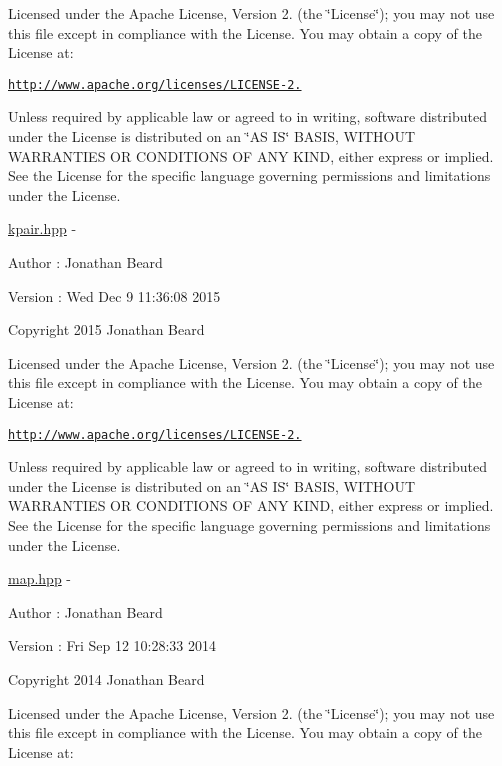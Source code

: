 Licensed under the Apache License, Version 2. (the \char`\"{}\+License\char`\"{}); you may not use this file except in compliance with the License. You may obtain a copy of the License at\+:

\href{http://www.apache.org/licenses/LICENSE-2.0}{\tt http\+://www.\+apache.\+org/licenses/\+L\+I\+C\+E\+N\+S\+E-\/2.}

Unless required by applicable law or agreed to in writing, software distributed under the License is distributed on an \char`\"{}\+A\+S I\+S\char`\"{} B\+A\+S\+IS, W\+I\+T\+H\+O\+UT W\+A\+R\+R\+A\+N\+T\+I\+ES OR C\+O\+N\+D\+I\+T\+I\+O\+NS OF A\+NY K\+I\+ND, either express or implied. See the License for the specific language governing permissions and limitations under the License.

\hyperlink{kpair_8hpp_source}{kpair.\+hpp} -\/ \begin{DoxyAuthor}{Author}
\+: Jonathan Beard 
\end{DoxyAuthor}
\begin{DoxyVersion}{Version}
\+: Wed Dec 9 11\+:36\+:08 2015
\end{DoxyVersion}
Copyright 2015 Jonathan Beard

Licensed under the Apache License, Version 2. (the \char`\"{}\+License\char`\"{}); you may not use this file except in compliance with the License. You may obtain a copy of the License at\+:

\href{http://www.apache.org/licenses/LICENSE-2.0}{\tt http\+://www.\+apache.\+org/licenses/\+L\+I\+C\+E\+N\+S\+E-\/2.}

Unless required by applicable law or agreed to in writing, software distributed under the License is distributed on an \char`\"{}\+A\+S I\+S\char`\"{} B\+A\+S\+IS, W\+I\+T\+H\+O\+UT W\+A\+R\+R\+A\+N\+T\+I\+ES OR C\+O\+N\+D\+I\+T\+I\+O\+NS OF A\+NY K\+I\+ND, either express or implied. See the License for the specific language governing permissions and limitations under the License.

\hyperlink{map_8hpp_source}{map.\+hpp} -\/ \begin{DoxyAuthor}{Author}
\+: Jonathan Beard 
\end{DoxyAuthor}
\begin{DoxyVersion}{Version}
\+: Fri Sep 12 10\+:28\+:33 2014
\end{DoxyVersion}
Copyright 2014 Jonathan Beard

Licensed under the Apache License, Version 2. (the \char`\"{}\+License\char`\"{}); you may not use this file except in compliance with the License. You may obtain a copy of the License at\+:

